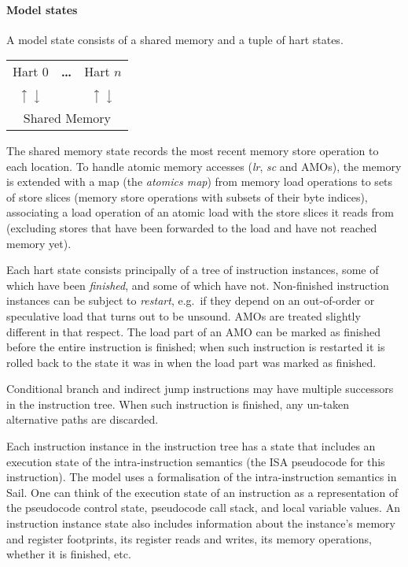\paragraph{Model states}
A model state consists of a shared memory and a tuple of hart states.
\begin{center}
\sffamily
\begin{tabular}{ccc}
\cline{1-1}\cline{3-3}
\multicolumn{1}{|c|}{Hart 0} & \bf \dots & \multicolumn{1}{|c|}{Hart $n$} \\
\cline{1-1}\cline{3-3}
$\big\uparrow$ $\big\downarrow$ & & $\big\uparrow$ $\big\downarrow$ \\
\hline
\multicolumn{3}{|c|}{Shared Memory} \\
\hline
\end{tabular}
\end{center}
The shared memory state records the most recent memory store operation to each location.
To handle atomic memory accesses ({\em  lr}, {\em sc} and AMOs), the
memory is extended with a map (the \emph{atomics map}) from memory
load operations to sets of store slices (memory store operations with subsets of
their byte indices), associating a load operation of an atomic load with the store slices it reads from (excluding stores that have been forwarded to the load and have not reached memory yet).

Each hart state consists principally of a tree of instruction instances, some of which have been \emph{finished}, and some of which have not.
Non-finished instruction instances can be subject to \emph{restart}, e.g.~if they depend on an out-of-order or speculative load that turns out to be unsound.
AMOs are treated slightly different in that respect.
The load part of an AMO can be marked as finished before the entire instruction is finished; when such instruction is restarted it is rolled back to the state it was in when the load part was marked as finished.

Conditional branch and indirect jump instructions may have multiple successors in the instruction tree.
When such instruction is finished, any un-taken alternative paths are discarded.

Each instruction instance in the instruction tree has a state that
includes an execution state of the intra-instruction semantics (the
ISA pseudocode for this instruction).
The model uses a formalisation of the intra-instruction semantics in Sail.
One can think of the execution state of an instruction as a representation of the pseudocode control state, pseudocode call stack, and local variable values.
An instruction instance state also includes information about the instance's memory and register footprints, its register reads and writes, its memory operations, whether it is finished, etc.

